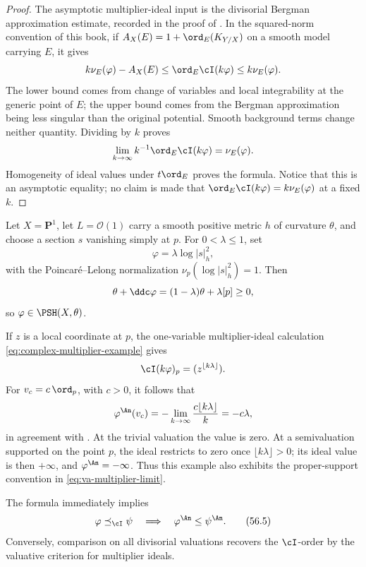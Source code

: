 \begin{proof}
The asymptotic multiplier-ideal input is the divisorial Bergman
approximation estimate, recorded in the proof of
\cite[Theorem~5.1]{BFJ08}. In the squared-norm convention of this book,
if $A_X(E)=1+\ord_E(K_{Y/X})$ on a smooth model carrying $E$, it gives
\[
 k\nu_E(\varphi)-A_X(E)
 \leq\ord_E\cI(k\varphi)\leq k\nu_E(\varphi).
\]
The lower bound comes from change of variables and local integrability
at the generic point of $E$; the upper bound comes from the Bergman
approximation being less singular than the original potential. Smooth
background terms change neither quantity. Dividing by $k$ proves
\[
 \lim_{k\to\infty}k^{-1}\ord_E\cI(k\varphi)=\nu_E(\varphi).
\]
Homogeneity of ideal values under $t\ord_E$ proves the formula.
Notice that this is an asymptotic equality; no claim is made that
$\ord_E\cI(k\varphi)=k\nu_E(\varphi)$ at a fixed $k$.
\end{proof}

\begin{example}
\label{ex:va-log-pole}
Let $X=\mathbf P^1$, let $L=\mathcal O(1)$ carry a smooth positive
metric $h$ of curvature $\theta$, and choose a section $s$ vanishing
simply at $p$.  For $0<\lambda\leq1$, set
\[
                       \varphi=\lambda\log|s|_h^2,
\]
with the Poincar\'e--Lelong normalization
$\nu_p(\log|s|_h^2)=1$.  Then
\[
              \theta+\ddc\varphi=(1-\lambda)\theta+\lambda[p]\geq0,
\]
so $\varphi\in\PSH(X,\theta)$.

If $z$ is a local coordinate at $p$, the one-variable multiplier-ideal
calculation \eqref{eq:complex-multiplier-example} gives
\[
                 \cI(k\varphi)_p=(z^{\lfloor k\lambda\rfloor}).
\]
For $v_c=c\,\ord_p$, with $c>0$, it follows that
\[
 \varphi^{\An}(v_c)
   =-\lim_{k\to\infty}\frac{c\lfloor k\lambda\rfloor}{k}
   =-c\lambda,
\]
in agreement with .  At the trivial
valuation the value is zero.  At a semivaluation supported on the point
$p$, the ideal restricts to zero once
$\lfloor k\lambda\rfloor>0$; its ideal value is then $+\infty$, and
$\varphi^{\An}=-\infty$.  Thus this example also exhibits the
proper-support convention in \eqref{eq:va-multiplier-limit}.
\end{example}

The formula immediately implies
\[
 \varphi\preceq_{\cI}\psi
       \quad\Longrightarrow\quad
 \varphi^{\An}\leq\psi^{\An}.
\tag{56.5}\label{eq:va-i-order}
\]
Conversely, comparison on all divisorial valuations recovers the
$\cI$-order by the valuative criterion for multiplier ideals.

